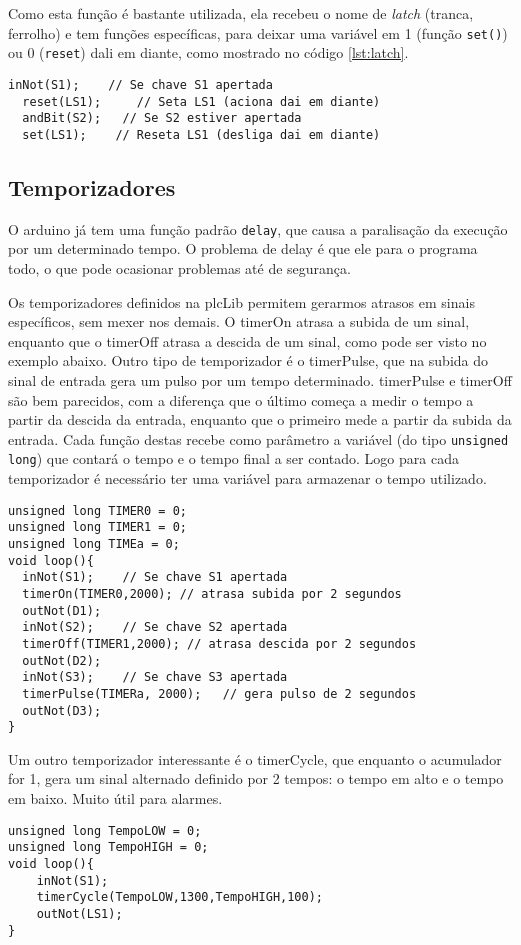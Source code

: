 Como esta função é bastante utilizada, ela recebeu o nome de \emph{latch} (tranca, ferrolho) e tem funções específicas, para deixar uma variável em 1 (função \lstinline|set()|) ou 0 (\lstinline|reset|) dali em diante, como mostrado no código \ref{lst:latch}.
\begin{lstlisting}[caption=Funções para uso de latch., label=lst:latch]
  inNot(S1);    // Se chave S1 apertada
  reset(LS1);     // Seta LS1 (aciona dai em diante)
  andBit(S2);   // Se S2 estiver apertada
  set(LS1);    // Reseta LS1 (desliga dai em diante)
\end{lstlisting}

\subsection{Temporizadores}
O arduino já tem uma função padrão \lstinline|delay|, que causa a paralisação da execução por um determinado tempo. O problema de delay é que ele para o programa todo, o que pode ocasionar problemas até de segurança.

Os temporizadores definidos na plcLib permitem gerarmos atrasos em sinais específicos, sem mexer nos demais. O timerOn atrasa a subida de um sinal, enquanto que o timerOff atrasa a descida de um sinal, como pode ser visto no exemplo abaixo. Outro tipo de temporizador é o timerPulse, que na subida do sinal de entrada gera um pulso por um tempo determinado. timerPulse e timerOff são bem parecidos, com a diferença que o último começa a medir o tempo a partir da descida da entrada, enquanto que o primeiro mede a partir da subida da entrada. Cada função destas recebe como parâmetro a variável (do tipo \lstinline|unsigned long|) que contará o tempo e o tempo final a ser contado. Logo para cada temporizador é necessário ter uma variável para armazenar o tempo utilizado.
\begin{lstlisting}[caption=Exemplos de uso de temporizadores., label=lst:temporizador]
unsigned long TIMER0 = 0;
unsigned long TIMER1 = 0;
unsigned long TIMEa = 0;
void loop(){
  inNot(S1);    // Se chave S1 apertada
  timerOn(TIMER0,2000); // atrasa subida por 2 segundos
  outNot(D1);
  inNot(S2);    // Se chave S2 apertada
  timerOff(TIMER1,2000); // atrasa descida por 2 segundos
  outNot(D2);
  inNot(S3);    // Se chave S3 apertada
  timerPulse(TIMERa, 2000);   // gera pulso de 2 segundos
  outNot(D3);
}
\end{lstlisting}

Um outro temporizador interessante é o timerCycle, que enquanto o acumulador for 1, gera um sinal alternado definido por 2 tempos: o tempo em alto e o tempo em baixo. Muito útil para alarmes.
\begin{lstlisting}[caption=Exemplos de uso timerCycle., label=lst:timeCycle]
unsigned long TempoLOW = 0;
unsigned long TempoHIGH = 0;
void loop(){
	inNot(S1);
	timerCycle(TempoLOW,1300,TempoHIGH,100);
	outNot(LS1);
}
\end{lstlisting}

